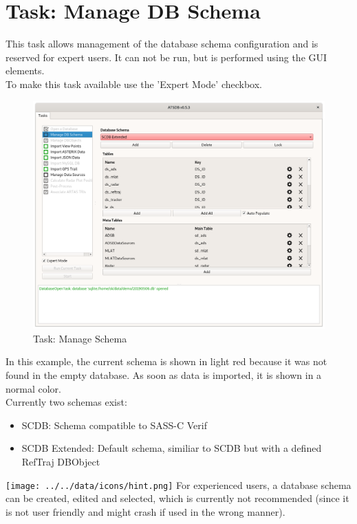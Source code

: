 \section{Task: Manage DB Schema}
\label{sec:task_manage_db_schema}

This task allows management of the database schema configuration and is reserved for expert users. It can not be run, but is performed using the GUI elements. \\

To make this task available use the 'Expert Mode' checkbox.

\begin{figure}[H]
  \hspace*{-2.5cm}
    \includegraphics[width=19cm]{figures/task_manage_schema.png}
  \caption{Task: Manage Schema}
\end{figure}

In this example, the current schema is shown in light red because it was not found in the empty database. As soon as data is imported, it is shown in a normal color. \\

Currently two schemas exist:
\begin{itemize}  
\item SCDB: Schema compatible to SASS-C Verif
\item SCDB Extended: Default schema, similiar to SCDB but with a defined RefTraj DBObject
\end{itemize} 

\texttt{[image: ../../data/icons/hint.png]} For experienced users, a database schema can be created, edited and selected, which is currently not recommended (since it is not user friendly and might crash if used in the wrong manner).
